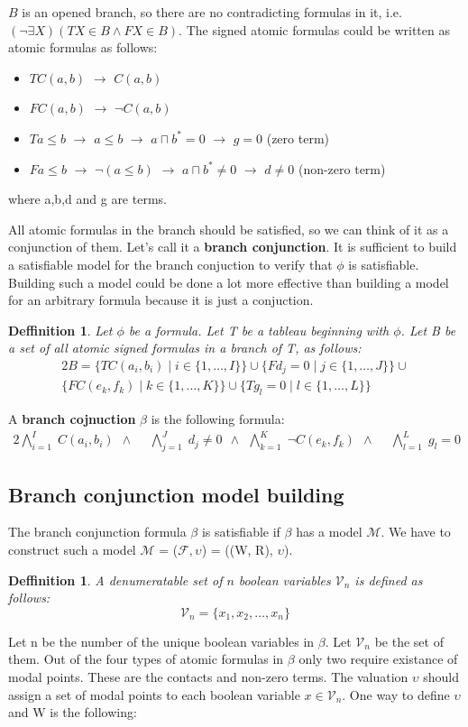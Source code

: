 \documentclass{article}
\newcommand\M{\mathcal{M}}
\newcommand\F{\mathcal{F}}
\newcommand\V{\mathcal{V}}
\newtheorem{defn}[theorem]{Deffinition}
\newcommand{\BranchConjunction}{%
\begin{alignat}{2}
			\bigwedge_{i=1}^{I} \; C(a_i, b_i) \:\: \wedge \:\: &
			\bigwedge_{j=1}^{J} \; d_j \neq 0 \:\: \wedge \:\:
			\bigwedge_{k=1}^{K} \; \neg C(e_k, f_k) \:\: \wedge \:\: &
			\bigwedge_{l=1}^{L} \; g_l = 0 \:\:
\end{alignat}%
}
\begin{document}
		\noindent $B$ is an opened branch, so there are no contradicting formulas in it, i.e. $(\neg \exists X)(T X \in B \land F X \in B)$.
		The signed atomic formulas could be written as atomic formulas as follows:
		\begin{itemize}
			\item $T C(a,b)$ $\rightarrow$ $C(a,b)$
			\item $F C(a,b)$ $\rightarrow$ $\neg C(a,b)$
			\item $T a \leq b$ $\rightarrow$ $a \leq b$ $\rightarrow$ $a \sqcap b^*=0$ $\rightarrow$ $g = 0$ (zero term)
			\item $F a \leq b$ $\rightarrow$ $\neg (a \leq b)$ $\rightarrow$ $a \sqcap b^* \neq 0$ $\rightarrow$ $d \neq 0$ (non-zero term)
		\end{itemize}
			\noindent where a,b,d and g are terms.

		All atomic formulas in the branch should be satisfied, so we can think of it as a conjunction of them. Let's call it a \textbf{branch conjunction}. It is sufficient to build a satisfiable model for the branch conjuction to verify that $\phi$ is satisfiable. Building  such a model could be done a lot more effective than building a model for an arbitrary formula because it is just a conjuction.
		\begin{defn}
			\label{branch-conjunction}
			Let $\phi$ be a formula. Let T be a tableau beginning with $\phi$. Let B be a set of all atomic signed formulas in a branch of T, as follows:
			\begin{alignat}{2}
				B = \{T C(a_i, b_i) \mid i \in \{1, \ldots, I\} \} \cup
					\{F d_j = 0 \mid j \in \{1, \ldots, J\} \} \cup \\\nonumber
					\{F C(e_k, f_k) \mid k \in \{1, \ldots, K\} \} \cup
					\{T g_l = 0 \mid l \in \{1, \ldots, L\} \}
			\end{alignat}
		\end{defn}
		A \textbf{branch cojnuction} $\beta$ is the following formula:
		 \BranchConjunction

	\subsection{Branch conjunction model building}
		The branch conjunction formula $\beta$ is satisfiable if $\beta$ has a model $\M$. We have to construct such a model $\M$ = ($\F, \upsilon$) = ((W, R), $\upsilon$). 
		\begin{defn}
			A denumeratable set of $n$ boolean variables $\V_n$ is defined as follows:
			\begin{equation}
				\label{boolean-evaluation}
				\V_n = \{x_1, x_2, \ldots , x_n \}
			\end{equation}
		\end{defn}
		Let n be the number of the unique boolean variables in $\beta$. Let $\V_n$ be the set of them. Out of the four types of atomic formulas in $\beta$ only two require existance of modal points. These are the contacts and non-zero terms. The valuation $\upsilon$ should assign a set of modal points to each boolean variable $x \in \V_n$. One way to define $\upsilon$ and W is the following: 
		
\end{document}
